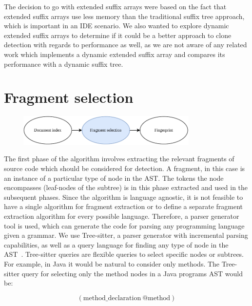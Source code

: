 The decision to go with extended suffix arrays were based on the fact that extended suffix
arrays use less memory than the traditional suffix tree approach, which is important in an
IDE scenario. We also wanted to explore dynamic extended suffix arrays to determine if it
could be a better approach to clone detection with regards to performance as well, as we
are not aware of any related work which implements a dynamic extended suffix array and
compares its performance with a dynamic suffix tree.

\section{Fragment selection}

\begin{figure}[H]
    \begin{center}
        \includegraphics[width=0.8\textwidth]{figures/phases/phases_fragmentselection.drawio.pdf}
    \end{center}
\end{figure}

The first phase of the algorithm involves extracting the relevant fragments of source code
which should be considered for detection. A fragment, in this case is an instance of a
particular type of node in the AST. The tokens the node encompasses (leaf-nodes of the
subtree) is in this phase extracted and used in the subsequent phases. Since the algorithm
is language agnostic, it is not feasible to have a single algorithm for fragment
extraction or to define a separate fragment extraction algorithm for every possible
language. Therefore, a parser generator tool is used, which can generate the code for
parsing any programming language given a grammar. We use Tree-sitter, a parser generator
with incremental parsing capabilities, as well as a query language for finding any type of
node in the AST~\cite{treesitter}. Tree-sitter queries are flexible queries to select
specific nodes or subtrees. For example, in Java it would be natural to consider only
methods. The Tree-sitter query for selecting only the method nodes in a Java programs AST
would be:

\begin{equation}
    (\mathrm{method\_declaration\ } \text{@method})
\end{equation}

